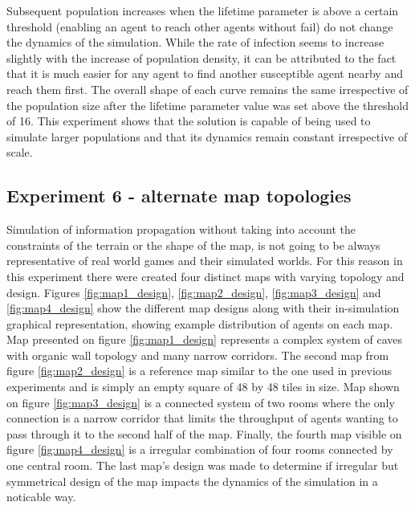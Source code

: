 Subsequent population increases when the lifetime parameter is above a certain threshold (enabling an agent to reach other agents without fail) do not change the dynamics of the simulation.
While the rate of infection seems to increase slightly with the increase of population density, it can be attributed to the fact that it is much easier for any agent to find another susceptible agent nearby and reach them first.
The overall shape of each curve remains the same irrespective of the population size after the lifetime parameter value was set above the threshold of 16.
This experiment shows that the solution is capable of being used to simulate larger populations and that its dynamics remain constant irrespective of scale.

\subsection{Experiment 6 - alternate map topologies}

Simulation of information propagation without taking into account the constraints of the terrain or the shape of the map, is not going to be always representative of real world games and their simulated worlds.
For this reason in this experiment there were created four distinct maps with varying topology and design.
Figures \ref{fig:map1_design}, \ref{fig:map2_design}, \ref{fig:map3_design} and \ref{fig:map4_design} show the different map designs along with their in-simulation graphical representation, showing example distribution of agents on each map.
Map presented on figure \ref{fig:map1_design} represents a complex system of caves with organic wall topology and many narrow corridors.
The second map from figure \ref{fig:map2_design} is a reference map similar to the one used in previous experiments and is simply an empty square of 48 by 48 tiles in size.
Map shown on figure \ref{fig:map3_design} is a connected system of two rooms where the only connection is a narrow corridor that limits the throughput of agents wanting to pass through it to the second half of the map.
Finally, the fourth map visible on figure \ref{fig:map4_design} is a irregular combination of four rooms connected by one central room.
The last map's design was made to determine if irregular but symmetrical design of the map impacts the dynamics of the simulation in a noticable way.

